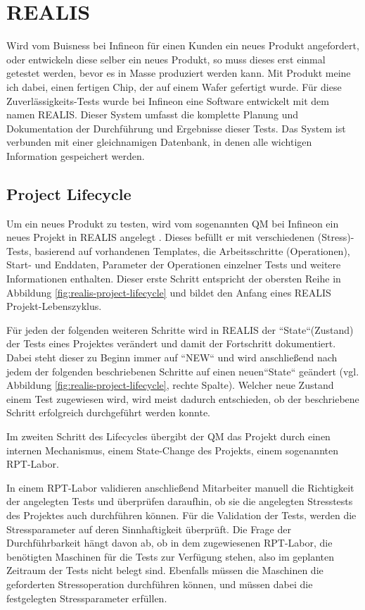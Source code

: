 \section{REALIS}\label{Sec:REALIS}
Wird vom Buisness bei Infineon für einen Kunden ein neues Produkt angefordert, oder entwickeln diese selber ein neues Produkt, so muss dieses erst einmal getestet werden, bevor es in Masse produziert werden kann. Mit Produkt meine ich dabei, einen fertigen Chip, der auf einem Wafer gefertigt wurde. Für diese Zuverlässigkeits-Tests wurde bei Infineon eine Software entwickelt mit dem namen \acf{REALIS}. Dieser System umfasst die komplette Planung und Dokumentation der Durchführung und Ergebnisse dieser Tests. Das System ist verbunden mit einer gleichnamigen Datenbank, in denen alle wichtigen Information gespeichert werden. 

\subsection{Project Lifecycle}\label{Subsec:project-lifecycle}
Um ein neues Produkt zu testen, wird vom sogenannten \ac{QM} bei Infineon ein neues Projekt in \ac{REALIS} angelegt . Dieses befüllt er mit verschiedenen (Stress)-Tests, basierend auf vorhandenen Templates, die Arbeitsschritte (Operationen), Start- und Enddaten, Parameter der Operationen einzelner Tests und weitere Informationen enthalten. Dieser erste Schritt entspricht der obersten Reihe in Abbildung \ref{fig:realis-project-lifecycle} und bildet den Anfang eines REALIS Projekt-Lebenszyklus. 

Für jeden der folgenden weiteren Schritte wird in \ac{REALIS} der ``State``(Zustand) der Tests eines Projektes verändert und damit der Fortschritt dokumentiert. Dabei steht dieser zu Beginn immer auf  ``NEW`` und wird anschließend nach jedem der folgenden beschriebenen Schritte auf einen neuen``State`` geändert (vgl. Abbildung \ref{fig:realis-project-lifecycle}, rechte Spalte). Welcher neue Zustand einem Test zugewiesen wird, wird meist dadurch entschieden, ob der beschriebene Schritt erfolgreich durchgeführt werden konnte.

Im zweiten Schritt des Lifecycles übergibt der \ac{QM} das Projekt durch einen internen Mechanismus, einem State-Change des Projekts, einem sogenannten  \ac{RPT}-Labor. 

In einem \ac{RPT}-Labor validieren anschließend Mitarbeiter manuell die Richtigkeit der angelegten Tests und überprüfen daraufhin, ob sie die angelegten Stresstests des Projektes auch durchführen können. 
Für die Validation der Tests, werden die Stressparameter auf deren Sinnhaftigkeit überprüft. Die Frage der Durchführbarkeit hängt davon ab, ob in dem zugewiesenen \ac{RPT}-Labor, die benötigten Maschinen für die Tests zur Verfügung stehen, also im geplanten Zeitraum der Tests nicht belegt sind. Ebenfalls müssen die Maschinen die geforderten Stressoperation durchführen können, und müssen dabei die festgelegten Stressparameter erfüllen.

